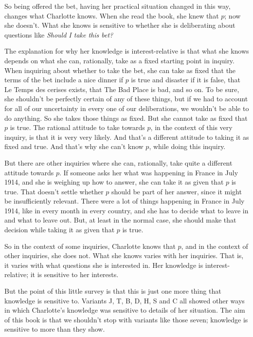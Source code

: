 \documentclass[11pt,]{book}
\begin{document}
So being offered the bet, having her practical situation changed in this way, changes what Charlotte knows. When she read the book, she knew that \(p\); now she doesn't. What she knows is sensitive to whether she is deliberating about questions like \emph{Should I take this bet?}

The explanation for why her knowledge is interest-relative is that what she knows depends on what she can, rationally, take as a fixed starting point in inquiry. When inquiring about whether to take the bet, she can take as fixed that the terms of the bet include a nice dinner if \(p\) is true and disaster if it is false, that Le Temps des cerises exists, that The Bad Place is bad, and so on. To be sure, she shouldn't be perfectly certain of any of these things, but if we had to account for all of our uncertainty in every one of our deliberations, we wouldn't be able to do anything. So she takes those things as fixed. But she cannot take as fixed that \(p\) is true. The rational attitude to take towards \(p\), in the context of this very inquiry, is that it is very very likely. And that's a different attitude to taking it as fixed and true. And that's why she can't know \(p\), while doing this inquiry.

But there are other inquiries where she can, rationally, take quite a different attitude towards \(p\). If someone asks her what was happening in France in July 1914, and she is weighing up how to answer, she can take it as given that \(p\) is true. That doesn't settle whether \(p\) should be part of her answer, since it might be insufficiently relevant. There were a lot of things happening in France in July 1914, like in every month in every country, and she has to decide what to leave in and what to leave out. But, at least in the normal case, she should make that decision while taking it as given that \(p\) is true.

So in the context of some inquiries, Charlotte knows that \(p\), and in the context of other inquiries, she does not. What she knows varies with her inquiries. That is, it varies with what questions she is interested in. Her knowledge is interest-relative; it is sensitive to her interests.

But the point of this little survey is that this is just one more thing that knowledge is sensitive to. Variants J, T, B, D, H, S and C all showed other ways in which Charlotte's knowledge was sensitive to details of her situation. The aim of this book is that we shouldn't stop with variants like those seven; knowledge is sensitive to more than they show.
\end{document}

